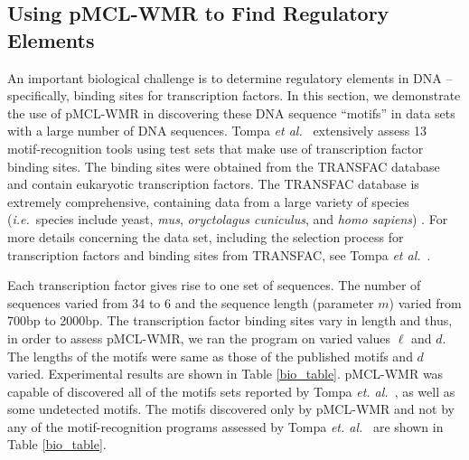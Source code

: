 \subsection{Using pMCL-WMR to Find Regulatory Elements}

An important biological challenge is to determine regulatory elements in DNA -- specifically, binding sites for transcription factors.  In this section, we demonstrate the use of pMCL-WMR in discovering these DNA sequence ``motifs'' in data sets with a large number of DNA sequences. Tompa {\em et al.}\ \cite{tompa} extensively assess 13 motif-recognition tools using test sets that make use of transcription factor binding sites. The binding sites were obtained from the TRANSFAC database \cite{WDKK96} and contain eukaryotic transcription factors.  The TRANSFAC database is extremely comprehensive, containing data from a large variety of species ({\em i.e.}\ species include yeast, {\em mus}, {\em oryctolagus cuniculus}, and {\em homo sapiens}) \cite{WDKK96}. For more details concerning the data set, including the selection process for transcription factors and binding sites from TRANSFAC, see Tompa {\em et al.}\ \cite{tompa}.  

Each transcription factor gives rise to one set of sequences. The number of sequences varied from 34 to 6 and the sequence length (parameter $m$) varied from 700bp to 2000bp. The transcription factor binding sites vary in length and thus, in order to assess pMCL-WMR, we ran the program on varied values $\ell$ and $d$.  The lengths of the motifs were same as those of the published motifs and $d$ varied.  Experimental results are shown in Table \ref{bio_table}.  pMCL-WMR was capable of discovered all of the motifs sets reported by Tompa {\em et. al.}\ \cite{tompa}, as well as some undetected motifs.  The motifs discovered only by pMCL-WMR and not by  any of the motif-recognition programs assessed by Tompa {\em et. al.}\ \cite{tompa} are shown in Table \ref{bio_table}. 

